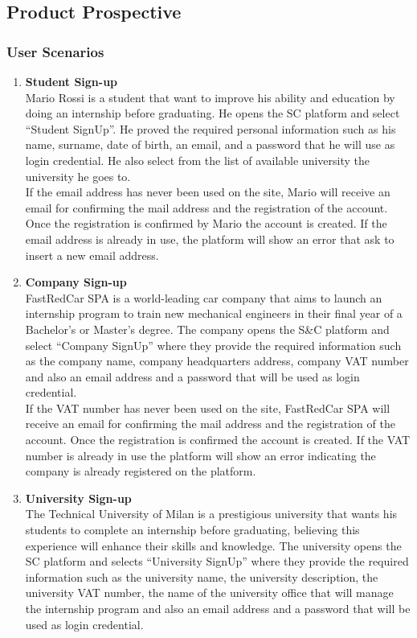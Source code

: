 \subsection{Product Prospective}

\subsubsection{User Scenarios}

\begin{enumerate}
    \item \textbf{Student Sign-up}\\
        Mario Rossi is a student that want to improve his ability and education by doing an internship before graduating. He opens the SC platform and select “Student SignUp”. He proved the required personal information such as his name, surname, date of birth, an email, and a password that he will use as login credential. He also select from the list of available university the university he goes to.\\
        If the email address has never been used on the site, Mario will receive an email for confirming the mail address and the registration of the account. Once the registration is confirmed by Mario the account is created. If the email address is already in use, the platform will show an error that ask to insert a new email address.
    \item \textbf{Company Sign-up}\\
        FastRedCar SPA is a world-leading car company that aims to launch an internship program to train new mechanical engineers in their final year of a Bachelor’s or Master’s degree. The company opens the S\&C platform and select “Company SignUp” where they provide the required information such as the company name, company headquarters address, company VAT number and also an email address and a password that will be used as login credential.\\
        If the VAT number has never been used on the site, FastRedCar SPA will receive an email for confirming the mail address and the registration of the account. Once the registration is confirmed the account is created.
        If the VAT number is already in use the platform will show an error indicating the company is already registered on the platform.
    \item \textbf{University Sign-up}\\
        The Technical University of Milan is a prestigious university that wants his students to complete an internship before graduating, believing this experience will enhance their skills and knowledge. The university opens the SC platform and selects “University SignUp” where they provide the required information such as the university name, the university description, the university VAT number, the name of the university office that will manage the internship program and also an email address and a password that will be used as login credential.\\

\end{enumerate}
